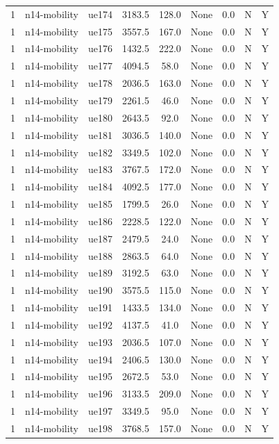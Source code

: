 \begin{table}[ht]
\begin{tabular}{|c|c|c|c|c|c|c|c|c|}
1 & n14-mobility & ue174 & 3183.5 & 128.0 & None & 0.0 & N & Y \\
1 & n14-mobility & ue175 & 3557.5 & 167.0 & None & 0.0 & N & Y \\
1 & n14-mobility & ue176 & 1432.5 & 222.0 & None & 0.0 & N & Y \\
1 & n14-mobility & ue177 & 4094.5 & 58.0 & None & 0.0 & N & Y \\
1 & n14-mobility & ue178 & 2036.5 & 163.0 & None & 0.0 & N & Y \\
1 & n14-mobility & ue179 & 2261.5 & 46.0 & None & 0.0 & N & Y \\
1 & n14-mobility & ue180 & 2643.5 & 92.0 & None & 0.0 & N & Y \\
1 & n14-mobility & ue181 & 3036.5 & 140.0 & None & 0.0 & N & Y \\
1 & n14-mobility & ue182 & 3349.5 & 102.0 & None & 0.0 & N & Y \\
1 & n14-mobility & ue183 & 3767.5 & 172.0 & None & 0.0 & N & Y \\
1 & n14-mobility & ue184 & 4092.5 & 177.0 & None & 0.0 & N & Y \\
1 & n14-mobility & ue185 & 1799.5 & 26.0 & None & 0.0 & N & Y \\
1 & n14-mobility & ue186 & 2228.5 & 122.0 & None & 0.0 & N & Y \\
1 & n14-mobility & ue187 & 2479.5 & 24.0 & None & 0.0 & N & Y \\
1 & n14-mobility & ue188 & 2863.5 & 64.0 & None & 0.0 & N & Y \\
1 & n14-mobility & ue189 & 3192.5 & 63.0 & None & 0.0 & N & Y \\
1 & n14-mobility & ue190 & 3575.5 & 115.0 & None & 0.0 & N & Y \\
1 & n14-mobility & ue191 & 1433.5 & 134.0 & None & 0.0 & N & Y \\
1 & n14-mobility & ue192 & 4137.5 & 41.0 & None & 0.0 & N & Y \\
1 & n14-mobility & ue193 & 2036.5 & 107.0 & None & 0.0 & N & Y \\
1 & n14-mobility & ue194 & 2406.5 & 130.0 & None & 0.0 & N & Y \\
1 & n14-mobility & ue195 & 2672.5 & 53.0 & None & 0.0 & N & Y \\
1 & n14-mobility & ue196 & 3133.5 & 209.0 & None & 0.0 & N & Y \\
1 & n14-mobility & ue197 & 3349.5 & 95.0 & None & 0.0 & N & Y \\
1 & n14-mobility & ue198 & 3768.5 & 157.0 & None & 0.0 & N & Y \\

\end{tabular}
\end{table}
